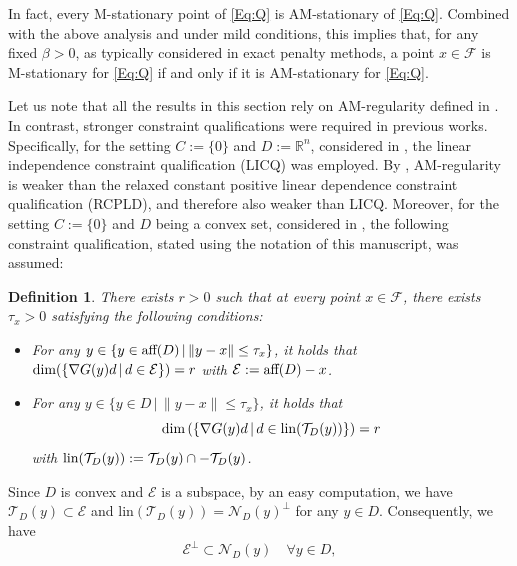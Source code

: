 \documentclass[11pt,a4paper,reqno]{amsart}
\newtheorem{definition}[theorem]{Definition}
\begin{document}
{In fact, every M-stationary point of \eqref{Eq:Q} is AM-stationary of \eqref{Eq:Q}. Combined with the above analysis and under mild conditions, this implies that, for any fixed $\beta>0$, as typically considered in exact penalty methods, a point $x\in \mathcal F$ is M-stationary for \eqref{Eq:Q} if and only if it is AM-stationary for \eqref{Eq:Q}.

Let us note that all the results in this section rely on AM-regularity defined in . In contrast, stronger constraint qualifications were required in previous works. Specifically, for the setting $C:=\{0\}$ and $D:=\mathbb R^n$, considered in \cite{xiao2024dissolving}, the linear independence constraint qualification (LICQ) was employed. By \cite[Lemma~2.7]{jia2023augmented}, AM-regularity is weaker than the relaxed constant positive linear dependence constraint qualification (RCPLD), and therefore also weaker than LICQ. Moreover, for the setting $C:=\{0\}$ and $D$
being a convex set, considered in \cite{xiao2026exact}, the following constraint qualification, stated using the notation of this manuscript, was assumed:
\begin{definition}\label{Def:rCRCQ}
    There exists $r>0$ such that at every point $x\in \mathcal F$, there exists $\tau_x>0$ satisfying the following conditions:
    \begin{itemize}
        \item[(a)] For any $y\in \{y\in \text{\rm aff}(D) \,|\, \|y-x\|\leq \tau_x\}$, it holds that $\text{\rm dim}(\{\nabla G(y)d\,|\,d\in \mathcal E\})=r$ with $\mathcal E:=\text{\rm aff}(D)-x$.
        \item[(b)] For any $y\in \{y\in D \,|\, \|y-x\| \leq \tau_x\}$, it holds that
        \begin{equation*}
            \text{\rm dim}\left(\{\nabla G(y)d \,|\, d\in \text{\rm lin}(\mathcal T_D(y))\}\right) =r
        \end{equation*}
        with $\text{\rm lin}(\mathcal T_D(y)):=\mathcal T_D(y) \cap - \mathcal T_D(y)$.
    \end{itemize}
\end{definition}
Since $D$ is convex and $\mathcal E$ is a subspace, by an easy computation, we have $\mathcal T_D(y)\subset \mathcal E$ and $\text{lin}(\mathcal T_D(y))=\mathcal N_D(y)^{\perp}$ for any $y\in D$. Consequently, we have \begin{equation}\label{Eq:resultE}
\mathcal E^{\perp} \subset \mathcal N_D(y) \quad \forall y\in D,
\end{equation}
}
\end{document}
